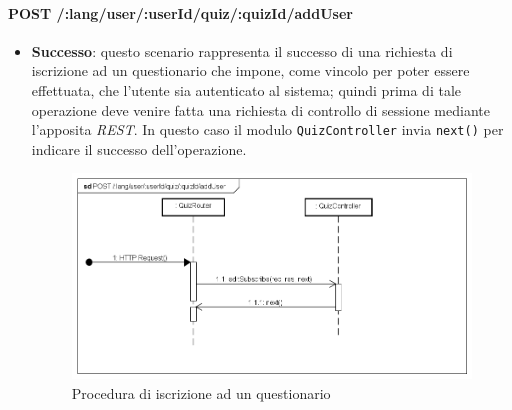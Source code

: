 \paragraph{POST /:lang/user/:userId/quiz/:quizId/addUser} %
\begin{itemize}
\item \textbf{Successo}: questo scenario rappresenta il successo di una richiesta di iscrizione ad un questionario che impone, come vincolo per poter essere effettuata, che l'utente sia autenticato al sistema; quindi prima di tale operazione deve venire fatta una richiesta di controllo di sessione mediante l'apposita \textit{REST}. In questo caso il modulo \texttt{QuizController} invia \texttt{next()} per indicare il successo dell'operazione.
\label{Procedura di iscrizione ad un questionario}
\begin{figure}[ht]
	\centering
	\includegraphics[scale=0.40]{UML/DiagrammiDiSequenza/Back-end/POST__lang_user_userId_quiz_quizId_addUser_success.png}
	\caption{Procedura di iscrizione ad un questionario}
\end{figure}
\FloatBarrier


\end{itemize}

